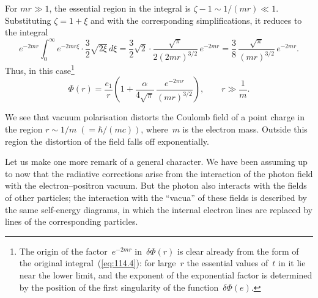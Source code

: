 For $mr \gg 1$, the essential region in the integral is $\zeta - 1 \sim 1/(mr) \ll 1$. Substituting $\zeta = 1 + \xi$ and with the corresponding simplifications, it reduces to the integral
\[
e^{-2mr}\int_0^\infty e^{-2mr\xi}\cdot\frac{3}{2}\sqrt{2\xi}\,d\xi
= \frac{3}{2}\sqrt{2}\cdot\frac{\sqrt{\pi}}{2(2mr)^{3/2}}\,e^{-2mr}
= \frac{3}{8}\,\frac{\sqrt{\pi}}{(mr)^{3/2}}\,e^{-2mr}.
\]
Thus, in this case\footnote{The origin of the factor~$e^{-2mr}$ in~$\delta\Phi(r)$ is clear already from the form of the original integral~(\ref{eq:114.4}): for large~$r$ the essential values of~$t$ in it lie near the lower limit, and the exponent of the exponential factor is determined by the position of the first singularity of the function~$\delta\Phi(e)$.}
\begin{equation}
\Phi(r) = \frac{e_1}{r}\left(1 + \frac{\alpha}{4\sqrt{\pi}}\,\frac{e^{-2mr}}{(mr)^{3/2}}\right), \qquad r \gg \frac{1}{m}.
\label{eq:114.7}
\end{equation}

We see that vacuum polarisation distorts the Coulomb field of a point charge in the region $r \sim 1/m\;(= \hbar/(mc))$, where~$m$ is the electron mass. Outside this region the distortion of the field falls off exponentially.

Let us make one more remark of a general character. We have been assuming up to now that the radiative corrections arise from the interaction of the photon field with the electron--positron vacuum. But the photon also interacts with the fields of other particles; the interaction with the ``vacua'' of these fields is described by the same self-energy diagrams, in which the internal electron lines are replaced by lines of the corresponding particles.
